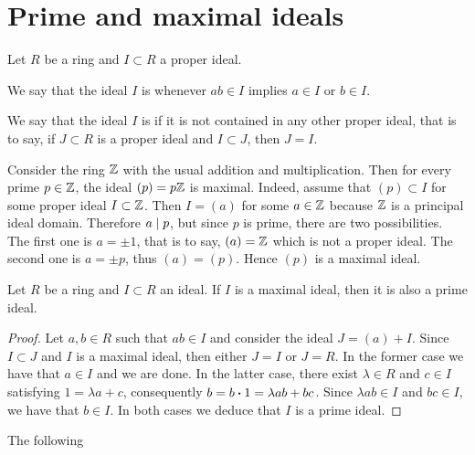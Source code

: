 

\section{Prime and maximal ideals}

\begin{definition}
	Let $R$ be a ring and $I \subset R$ a proper ideal.
	\begin{enumeratedef}
		\item We say that the ideal $I$ is  whenever $a b \in I$ implies $a \in I$ or $b \in I$.
		\item We say that the ideal $I$ is  if it is not contained in any other proper ideal, that is to say, if $J \subset R$ is a proper ideal and $I \subset J$, then $J = I$.
	\end{enumeratedef}
\end{definition}

\begin{example}
	Consider the ring $\mathbb{Z}$ with the usual addition and multiplication. Then for every prime $p \in \mathbb{Z}$, the ideal $(p) = p \mathbb{Z}$ is maximal. Indeed, assume that $(p) \subset I$ for some proper ideal $I \subset \mathbb{Z}$. Then $I = (a)$ for some $a \in \mathbb{Z}$ because $\mathbb{Z}$ is a principal ideal domain. Therefore $a \mid p$, but since $p$ is prime, there are two possibilities. The first one is $a = \pm 1$, that is to say, $(a) = \mathbb{Z}$ which is not a proper ideal. The second one is $a = \pm p$, thus $(a) = (p)$. Hence $(p)$ is a maximal ideal.
\end{example}

\begin{prop}
	Let $R$ be a ring and $I \subset R$ an ideal. If $I$ is a maximal ideal, then it is also a prime ideal.
\end{prop}
\begin{proof}
	Let $a, b \in R$ such that $a b \in I$ and consider the ideal $J = (a) + I$. Since $I \subset J$ and $I$ is a maximal ideal, then either $J = I$ or $J = R$. In the former case we have that $a \in I$ and we are done. In the latter case, there exist $\lambda \in R$ and $c \in I$ satisfying $1 = \lambda a + c$, consequently $b = b \vdot 1 = \lambda a b + b c$. Since $\lambda a b \in I$ and $b c \in I$, we have that $b \in I$. In both cases we deduce that $I$ is a prime ideal.
\end{proof}

The following 


